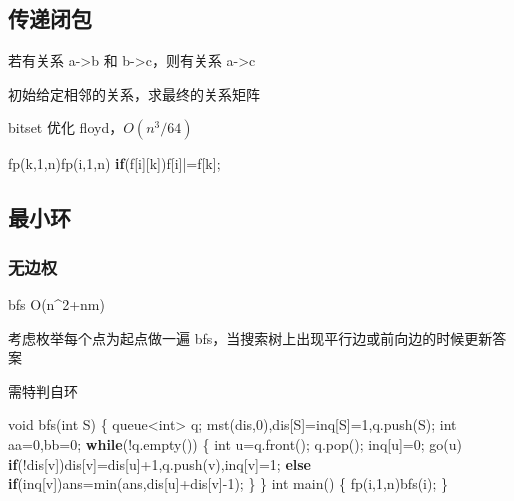 \documentclass[
]{article}
\newenvironment{Shaded}{}{}
\newcommand{\ControlFlowTok}[1]{\textcolor[rgb]{0.00,0.44,0.13}{\textbf{#1}}}
\newcommand{\DataTypeTok}[1]{\textcolor[rgb]{0.56,0.13,0.00}{#1}}
\newcommand{\DecValTok}[1]{\textcolor[rgb]{0.25,0.63,0.44}{#1}}
\newcommand{\NormalTok}[1]{#1}
\begin{document}
\hypertarget{ux4f20ux9012ux95edux5305}{%
\subsection{传递闭包}\label{ux4f20ux9012ux95edux5305}}

若有关系 a-\textgreater b 和 b-\textgreater c，则有关系 a-\textgreater c

初始给定相邻的关系，求最终的关系矩阵

bitset 优化 floyd，\(O(n^3/64)\)

\begin{Shaded}
\begin{Highlighting}[]
\NormalTok{fp(k,}\DecValTok{1}\NormalTok{,n)fp(i,}\DecValTok{1}\NormalTok{,n)}
    \ControlFlowTok{if}\NormalTok{(f[i][k])f[i]|=f[k];}
\end{Highlighting}
\end{Shaded}

\hypertarget{ux6700ux5c0fux73af}{%
\subsection{最小环}\label{ux6700ux5c0fux73af}}

\hypertarget{ux65e0ux8fb9ux6743}{%
\subsubsection{无边权}\label{ux65e0ux8fb9ux6743}}

bfs O(n\^{}2+nm)

考虑枚举每个点为起点做一遍
bfs，当搜索树上出现平行边或前向边的时候更新答案

需特判自环

\begin{Shaded}
\begin{Highlighting}[]
\DataTypeTok{void}\NormalTok{ bfs(}\DataTypeTok{int}\NormalTok{ S)}
\NormalTok{\{}
\NormalTok{    queue\textless{}}\DataTypeTok{int}\NormalTok{\textgreater{} q; mst(dis,}\DecValTok{0}\NormalTok{),dis[S]=inq[S]=}\DecValTok{1}\NormalTok{,q.push(S);}
    \DataTypeTok{int}\NormalTok{ aa=}\DecValTok{0}\NormalTok{,bb=}\DecValTok{0}\NormalTok{;}
    \ControlFlowTok{while}\NormalTok{(!q.empty())}
\NormalTok{    \{}
        \DataTypeTok{int}\NormalTok{ u=q.front(); q.pop(); inq[u]=}\DecValTok{0}\NormalTok{;}
\NormalTok{        go(u)}
            \ControlFlowTok{if}\NormalTok{(!dis[v])dis[v]=dis[u]+}\DecValTok{1}\NormalTok{,q.push(v),inq[v]=}\DecValTok{1}\NormalTok{;}
            \ControlFlowTok{else} \ControlFlowTok{if}\NormalTok{(inq[v])ans=min(ans,dis[u]+dis[v]{-}}\DecValTok{1}\NormalTok{);}
\NormalTok{    \}}
\NormalTok{\}}
\DataTypeTok{int}\NormalTok{ main()}
\NormalTok{\{}
\NormalTok{    fp(i,}\DecValTok{1}\NormalTok{,n)bfs(i);}
\NormalTok{\}}
\end{Highlighting}
\end{Shaded}
\end{document}
